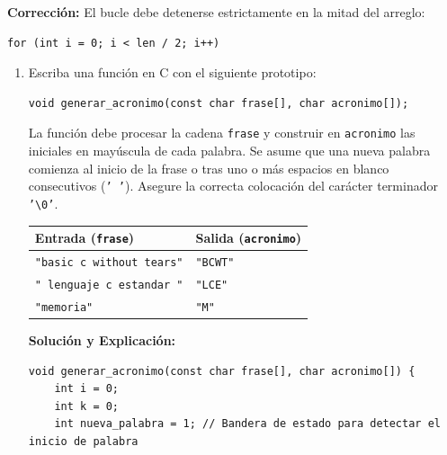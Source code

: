 \documentclass[11pt,letterpaper]{article}
\begin{document}
\begin{enumerate}[label=\textbf{\arabic*.}]
\begin{enumerate}[label=(\alph*)]
\begin{solucionbox}
        \noindent \textbf{Corrección:} El bucle debe detenerse estrictamente en la mitad del arreglo:
        \begin{lstlisting}[style=customc, numbers=none]
for (int i = 0; i < len / 2; i++)
        \end{lstlisting}
        \end{solucionbox}
    \end{enumerate}

    \newpage
    \begin{enumerate}[label=(\alph*), resume]
        \item Escriba una función en C con el siguiente prototipo:
        \begin{lstlisting}[style=customc, numbers=none]
void generar_acronimo(const char frase[], char acronimo[]);
        \end{lstlisting}
        La función debe procesar la cadena \texttt{frase} y construir en \texttt{acronimo} las iniciales en mayúscula de cada palabra. Se asume que una nueva palabra comienza al inicio de la frase o tras uno o más espacios en blanco consecutivos (\texttt{' '}). Asegure la correcta colocación del carácter terminador \texttt{'\textbackslash 0'}.
        
        \begin{center}
        \begin{tabular}{ll}
        \toprule
        \textbf{Entrada (\texttt{frase})} & \textbf{Salida (\texttt{acronimo})} \\
        \midrule
        \texttt{"basic c without tears"} & \texttt{"BCWT"} \\
        \texttt{"  lenguaje   c   estandar  "} & \texttt{"LCE"} \\
        \texttt{"memoria"} & \texttt{"M"} \\
        \bottomrule
        \end{tabular}
        \end{center}

        \begin{solucionbox}
        \textbf{Solución y Explicación:}
        
        \begin{lstlisting}[style=customc]
void generar_acronimo(const char frase[], char acronimo[]) {
    int i = 0;
    int k = 0;
    int nueva_palabra = 1; // Bandera de estado para detectar el inicio de palabra


\end{lstlisting}
\end{solucionbox}
\end{enumerate}
\end{enumerate}
\end{document}
